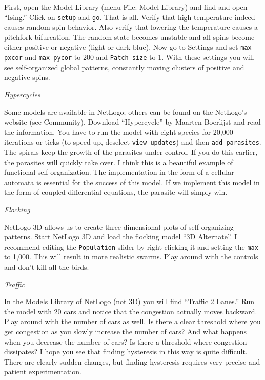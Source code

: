 \documentclass[
  a4paper,
  DIV=11,
  numbers=noendperiod,
  oneside]{scrreprt}
\begin{document}
First, open the Model Library (menu File: Model Library) and find and
open ``Ising.'' Click on \texttt{setup} and \texttt{go}. That is all.
Verify that high temperature indeed causes random spin behavior. Also
verify that lowering the temperature causes a pitchfork bifurcation. The
random state becomes unstable and all spins become either positive or
negative (light or dark blue). Now go to Settings and set
\texttt{max-pxcor} and \texttt{max-pycor} to 200 and
\texttt{Patch\ size} to 1. With these settings you will see
self-organized global patterns, constantly moving clusters of positive
and negative spins.

\emph{Hypercycles}

Some models are available in NetLogo; others can be found on the
NetLogo's website (see Community). Download ``Hypercycle'' by Maarten
Boerlijst and read the information. You have to run the model with eight
species for 20,000 iterations or ticks (to speed up, deselect
\texttt{view\ updates}) and then \texttt{add\ parasites}. The spirals
keep the growth of the parasites under control. If you do this earlier,
the parasites will quickly take over. I think this is a beautiful
example of functional self-organization. The implementation in the form
of a cellular automata is essential for the success of this model. If we
implement this model in the form of coupled differential equations, the
parasite will simply win.

\emph{Flocking}

NetLogo 3D allows us to create three-dimensional plots of
self-organizing patterns. Start NetLogo 3D and load the flocking model
``3D Alternate''. I recommend editing the \texttt{Population} slider by
right-clicking it and setting the \texttt{max} to 1,000. This will
result in more realistic swarms. Play around with the controls and don't
kill all the birds.

\emph{Traffic}

In the Models Library of NetLogo (not 3D) you will find ``Traffic 2
Lanes.'' Run the model with 20 cars and notice that the congestion
actually moves backward. Play around with the number of cars as well. Is
there a clear threshold where you get congestion as you slowly increase
the number of cars? And what happens when you decrease the number of
cars? Is there a threshold where congestion dissipates? I hope you see
that finding hysteresis in this way is quite difficult. There are
clearly sudden changes, but finding hysteresis requires very precise and
patient experimentation.
\end{document}
